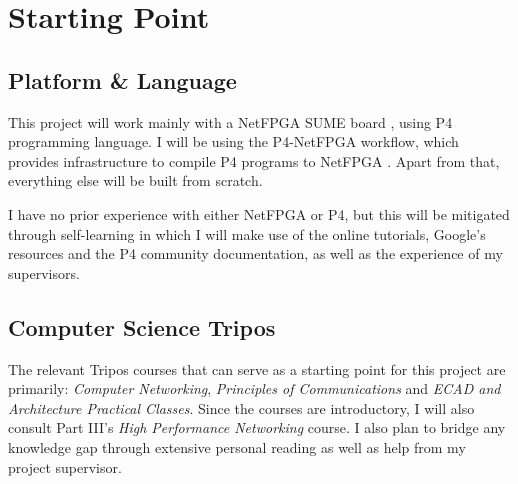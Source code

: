 \section*{\fontsize{18pt}{0.5}\selectfont Starting Point}

\subsection*{Platform \& Language}
This project will work mainly with a NetFPGA SUME board \cite{netfpgasume}, using P4 programming language. I will be using the P4-NetFPGA workflow, which provides infrastructure to compile P4 programs to NetFPGA \cite{fpga}. Apart from that, everything else will be built from scratch.

I have no prior experience with either NetFPGA or P4, but this will be mitigated through self-learning in which I will make use of the online tutorials, Google's resources and the P4 community documentation, as well as the experience of my supervisors. 

\subsection*{Computer Science Tripos}
The relevant Tripos courses that can serve as a starting point for this project are primarily: \emph{Computer Networking}, \emph{Principles of Communications} and \emph{ECAD and Architecture Practical Classes}. Since the courses are introductory, I will also consult Part III's \emph{High Performance Networking} course. I also plan to bridge any knowledge gap through extensive personal reading as well as help from my project supervisor.